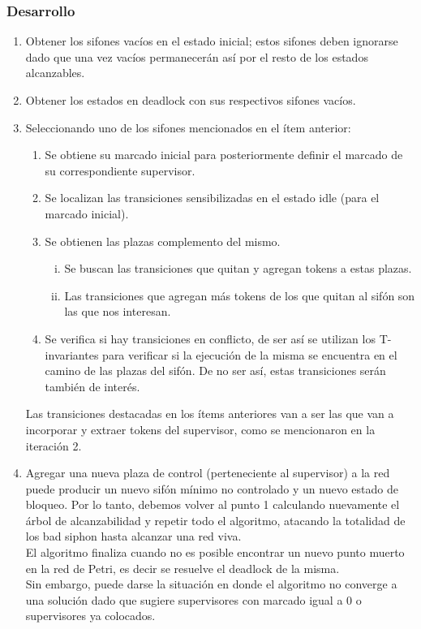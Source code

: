 \newpage
\subsubsection{Desarrollo} \label{sec:desarrollov3}
\begin{enumerate}
    \item Obtener los sifones vacíos en el estado inicial; estos sifones deben ignorarse dado que una vez vacíos permanecerán así por el resto de los estados alcanzables.
    \item Obtener los estados en deadlock con sus respectivos sifones vacíos. 
    \item Seleccionando uno de los sifones mencionados en el ítem anterior:
        \begin{enumerate}
            \item Se obtiene su marcado inicial para posteriormente definir el marcado de su correspondiente supervisor.
            \item Se localizan las transiciones sensibilizadas en el estado idle (para el marcado inicial). 
            \item Se obtienen las plazas complemento del mismo.
                \begin{enumerate}[i. ]
                    \item Se buscan las transiciones que quitan y agregan tokens a estas plazas. 
                    \item Las transiciones que agregan más tokens de los que quitan al sifón son las que nos interesan.
                \end{enumerate}
            \item Se verifica si hay transiciones en conflicto, de ser así se utilizan los \break T-invariantes para verificar si la ejecución de la misma se encuentra en el camino de las plazas del sifón. De no ser así, estas transiciones serán también de interés.
        \end{enumerate}
    Las transiciones destacadas en los ítems anteriores van a ser las que van a incorporar y extraer tokens del supervisor, como se mencionaron en la iteración 2.

    \item Agregar una nueva plaza de control (perteneciente al supervisor) a la red puede producir un nuevo sifón mínimo no controlado y un nuevo estado de bloqueo. Por lo tanto, debemos volver al punto 1 calculando nuevamente el árbol de alcanzabilidad y repetir todo el algoritmo, atacando la totalidad de los bad siphon hasta alcanzar una red viva. \\
    El algoritmo finaliza cuando no es posible encontrar un nuevo punto muerto en la red de Petri, es decir se resuelve el deadlock de la misma. \\ Sin embargo, puede darse la situación en donde el algoritmo no converge a una solución dado que sugiere supervisores con marcado igual a 0 o supervisores ya colocados.


\end{enumerate}

